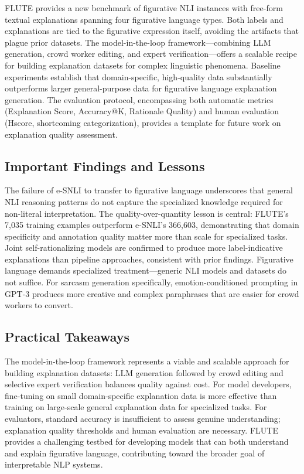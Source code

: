 \documentclass[12pt]{article}
\begin{document}
FLUTE provides a new benchmark of figurative NLI instances with free-form textual explanations spanning four figurative language types. Both labels and explanations are tied to the figurative expression itself, avoiding the artifacts that plague prior datasets. The model-in-the-loop framework---combining LLM generation, crowd worker editing, and expert verification---offers a scalable recipe for building explanation datasets for complex linguistic phenomena. Baseline experiments establish that domain-specific, high-quality data substantially outperforms larger general-purpose data for figurative language explanation generation. The evaluation protocol, encompassing both automatic metrics (Explanation Score, Accuracy@K, Rationale Quality) and human evaluation (Hscore, shortcoming categorization), provides a template for future work on explanation quality assessment.

\subsection{Important Findings and Lessons}

The failure of e-SNLI to transfer to figurative language underscores that general NLI reasoning patterns do not capture the specialized knowledge required for non-literal interpretation. The quality-over-quantity lesson is central: FLUTE's 7,035 training examples outperform e-SNLI's 366,603, demonstrating that domain specificity and annotation quality matter more than scale for specialized tasks. Joint self-rationalizing models are confirmed to produce more label-indicative explanations than pipeline approaches, consistent with prior findings. Figurative language demands specialized treatment---generic NLI models and datasets do not suffice. For sarcasm generation specifically, emotion-conditioned prompting in GPT-3 produces more creative and complex paraphrases that are easier for crowd workers to convert.

\subsection{Practical Takeaways}

The model-in-the-loop framework represents a viable and scalable approach for building explanation datasets: LLM generation followed by crowd editing and selective expert verification balances quality against cost. For model developers, fine-tuning on small domain-specific explanation data is more effective than training on large-scale general explanation data for specialized tasks. For evaluators, standard accuracy is insufficient to assess genuine understanding; explanation quality thresholds and human evaluation are necessary. FLUTE provides a challenging testbed for developing models that can both understand and explain figurative language, contributing toward the broader goal of interpretable NLP systems.
\end{document}
